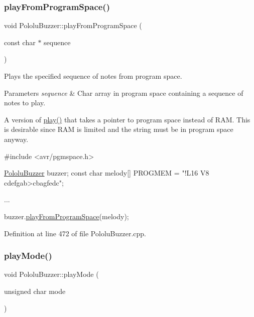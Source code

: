 \subsubsection{\texorpdfstring{play\+From\+Program\+Space()}{playFromProgramSpace()}}
{\footnotesize\ttfamily void Pololu\+Buzzer\+::play\+From\+Program\+Space (\begin{DoxyParamCaption}\item[{const char $\ast$}]{sequence }\end{DoxyParamCaption})\hspace{0.3cm}{\ttfamily [static]}}



Plays the specified sequence of notes from program space. 


\begin{DoxyParams}{Parameters}
{\em sequence} & Char array in program space containing a sequence of notes to play.\\
\hline
\end{DoxyParams}
A version of {\ttfamily \hyperlink{class_pololu_buzzer_a22f45ef7cdf9dc8fc54e617244368277}{play()}} that takes a pointer to program space instead of R\+AM. This is desirable since R\+AM is limited and the string must be in program space anyway.


\begin{DoxyCode}
\textcolor{preprocessor}{#include <avr/pgmspace.h>}

\hyperlink{class_pololu_buzzer}{PololuBuzzer} buzzer;
\textcolor{keyword}{const} \textcolor{keywordtype}{char} melody[] PROGMEM = \textcolor{stringliteral}{"!L16 V8 cdefgab>cbagfedc"};

...

buzzer.\hyperlink{class_pololu_buzzer_a07ff4e9d9f7e4f37a58e149640b61f4e}{playFromProgramSpace}(melody);
\end{DoxyCode}
 

Definition at line 472 of file Pololu\+Buzzer.\+cpp.

\mbox{\label{class_pololu_buzzer_ab72bde97ceceef8705f1bbaeccb970db}} 
\subsubsection{\texorpdfstring{play\+Mode()}{playMode()}}
{\footnotesize\ttfamily void Pololu\+Buzzer\+::play\+Mode (\begin{DoxyParamCaption}\item[{unsigned char}]{mode }\end{DoxyParamCaption})\hspace{0.3cm}{\ttfamily [static]}}



